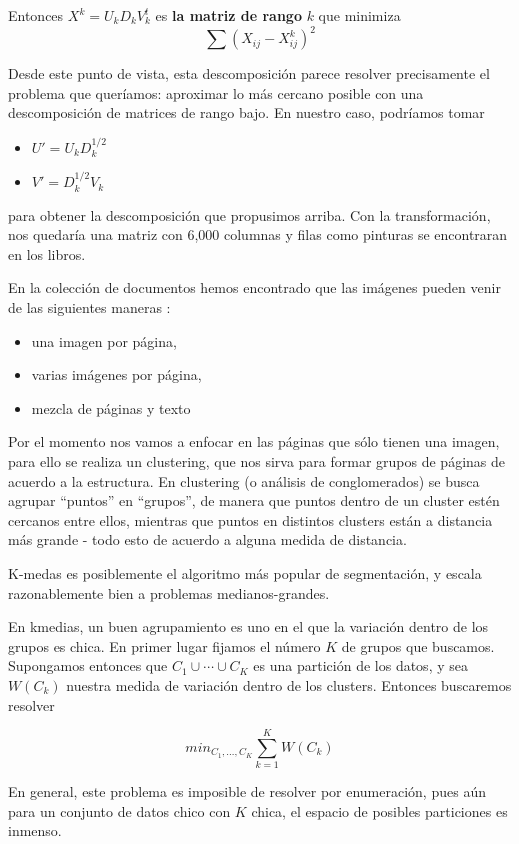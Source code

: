 Entonces $X^k=U_k D_k V_k^t$ es \textbf{la matriz de rango} $k$ que minimiza
$$\sum (X_{ij} -X_{ij}^k )^2$$


Desde este punto de vista, esta descomposición parece resolver precisamente el
problema que queríamos: aproximar lo más cercano posible con una descomposición de matrices de rango bajo. En nuestro caso, podríamos tomar

\begin{itemize}
\item $U' = U_k D_k^{1/2}$
\item $V' = D_k^{1/2} V_k$
\end{itemize}

para obtener la descomposición que propusimos arriba. Con la transformación, nos quedaría una matriz con 6,000 columnas y filas como pinturas se encontraran en los libros.


En la colección de documentos hemos encontrado que las imágenes pueden venir de las siguientes maneras : 

\begin{itemize}
\item una imagen por página,
\item varias imágenes por página, 
\item mezcla de páginas y texto
\end{itemize}
Por el momento nos vamos a enfocar en las páginas que sólo tienen una imagen, para ello se realiza  un clustering, que nos sirva para formar grupos de páginas de acuerdo a la estructura. En clustering (o análisis de conglomerados) se busca agrupar “puntos” en “grupos”, de manera que puntos dentro de un cluster estén cercanos entre ellos, mientras que puntos en distintos clusters están a distancia más grande - todo esto de acuerdo a alguna medida de distancia.

K-medas es posiblemente el algoritmo más popular de segmentación, y  escala razonablemente bien a problemas medianos-grandes.

En k\-medias, un buen agrupamiento es uno en el que la variación dentro de los grupos
es chica. En primer lugar fijamos el número $K$ de grupos que buscamos. Supongamos entonces que $C_1\cup\cdots\cup C_K$ es una partición de los
datos, y sea $W(C_k)$ nuestra medida de variación dentro de los clusters. Entonces
buscaremos resolver

$$min_{C_1,\ldots, C_K} \sum_{k=1}^K W(C_k)$$ 

En general, este problema es imposible de resolver por enumeración, pues aún para un conjunto de datos chico con $K$ chica, el espacio de posibles particiones es inmenso.

